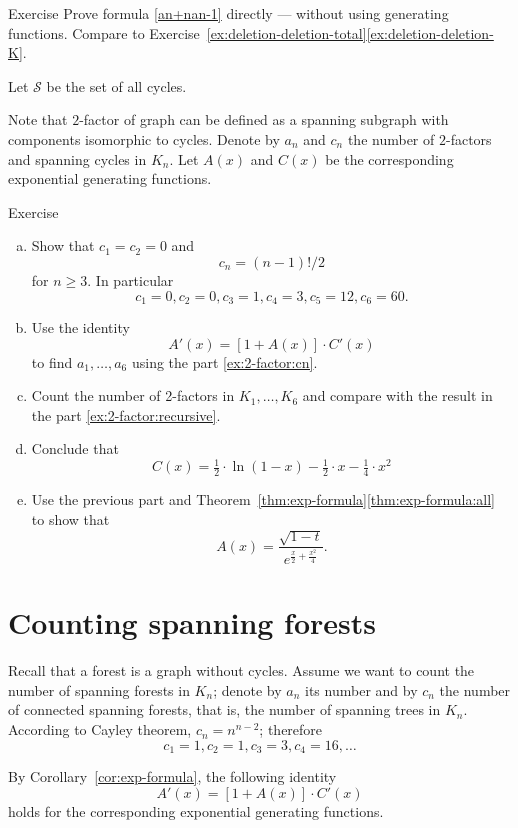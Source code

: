 \begin{thm}{Exercise}
Prove formula \ref{an+nan-1} directly --- without using generating functions.
Compare to Exercise~\ref{ex:deletion-deletion-total}\ref{ex:deletion-deletion-K}.
\end{thm}

Let $\mathcal{S}$ be the set of all cycles.

Note that $2$-factor of graph can be defined as a spanning subgraph with components isomorphic to cycles.
Denote by $a_n$ and $c_n$ the number of $2$-factors and spanning cycles in $K_n$.
Let $A(x)$ and $C(x)$ be the corresponding exponential generating functions.

\begin{thm}{Exercise}
\begin{enumerate}[(a)]
\item\label{ex:2-factor:cn} Show that $c_1=c_2=0$ and 
\[c_n=(n-1)!/2\]
for $n\ge 3$.
In particular 
\[c_1=0, c_2=0, c_3=1, c_4=3, c_5=12, c_6=60.\]
\item\label{ex:2-factor:recursive} Use the identity
\[A'(x)=[1+A(x)]\cdot C'(x)\]
to find $a_1,\dots, a_6$ using the part \ref{ex:2-factor:cn}.
\item Count the number of 2-factors in $K_1,\dots ,K_6$ and compare with the result in the part \ref{ex:2-factor:recursive}.
\item Conclude that 
\[C(x)=\tfrac12\cdot\ln(1-x)-\tfrac12\cdot x-\tfrac14\cdot x^2\]
\item Use the previous part and Theorem~\ref{thm:exp-formula}\ref{thm:exp-formula:all}
to show that
\[A(x)=\frac{\sqrt{1-t}}{e^{\frac x2+\frac{x^2}4}}.\]


\end{enumerate}

\end{thm}



\section*{Counting spanning forests}

Recall that a forest is a graph without cycles.
Assume we want to count the number of spanning forests in $K_n$;
denote by $a_n$ its number and by $c_n$ the number of connected spanning forests, that is, the number of spanning trees in $K_n$.
According to Cayley theorem, $c_n=n^{n-2}$;
therefore 
\[c_1=1, c_2=1, c_3=3, c_4=16,\dots\]

By Corollary~\ref{cor:exp-formula}, the following identity
\[A'(x)=[1+A(x)]\cdot C'(x)\]
holds for the corresponding exponential generating functions.

